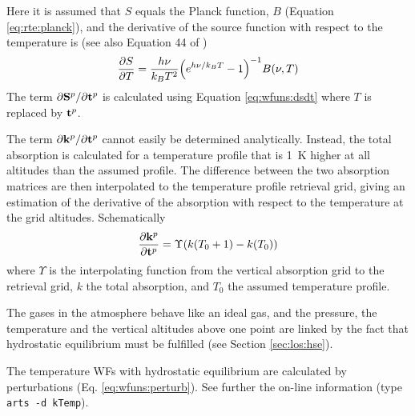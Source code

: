  Here it is assumed that $S$ equals the Planck function, $B$
 (Equation \ref{eq:rte:planck}), and the derivative of the source
 function with respect to the temperature is (see also Equation 44 of
 \citet{eriksson:00a})
 \begin{equation}
   \frac{\partial S}{\partial T} = \frac{h\nu}{k_BT^2}
        \Big( e^{h\nu/k_BT} - 1  \Big)^{-1}B(\nu,T)
   \label{eq:wfuns:dsdt}
 \end{equation}
 The term $\partial \mathbf{S}^p / \partial \mathbf{t}^p$ is calculated
 using Equation \ref{eq:wfuns:dsdt} where $T$ is replaced by $\mathbf{t}^p$.

 The term $\partial \mathbf{k}^p/\partial \mathbf{t}^p$ cannot easily be
 determined analytically. Instead, the total absorption is calculated
 for a temperature profile that is 1~K higher at all altitudes than
 the assumed profile. The difference between the two absorption
 matrices are then interpolated to the temperature profile retrieval
 grid, giving an estimation of the derivative of the absorption
 with respect to the temperature at the grid altitudes. Schematically
 \begin{eqnarray}
   \frac{\partial \mathbf{k}^p}{\partial \mathbf{t}^p} = \Upsilon(k(T_0+1)-k(T_0))
     \nonumber
 \end{eqnarray}
 where $\Upsilon$ is the interpolating function from the vertical
 absorption grid to the retrieval grid, $k$ the total absorption, and
 $T_0$ the assumed temperature profile.
 

 
 The gases in the atmosphere behave like an ideal gas, and the pressure,
 the temperature and the vertical altitudes above one point are
 linked by the fact that hydrostatic equilibrium must be fulfilled
 (see Section \ref{sec:los:hse}). 

 The temperature WFs with hydrostatic equilibrium are calculated by
 perturbations (Eq. \ref{eq:wfuns:perturb}). See further the on-line
 information (type \verb|arts -d kTemp|).


% 


